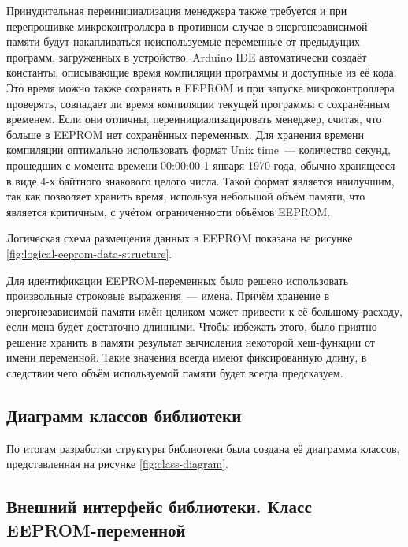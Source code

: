 Принудительная переинициализация менеджера также требуется и при перепрошивке микроконтроллера в противном случае в энергонезависимой памяти будут накапливаться неиспользуемые переменные от предыдущих программ, загруженных в устройство.
Arduino IDE автоматически создаёт константы, описывающие время компиляции программы и доступные из её кода.
Это время можно также сохранять в EEPROM и при запуске микроконтроллера проверять, совпадает ли время компиляции текущей программы с сохранённым временем.
Если они отличны, переинициализацировать менеджер, считая, что больше в EEPROM нет сохранённых переменных.
Для хранения времени компиляции оптимально использовать формат Unix time~--- количество секунд, прошедших с момента времени 00:00:00 1 января 1970 года, обычно хранящееся в виде 4-х байтного знакового целого числа.
Такой формат является наилучшим, так как позволяет хранить время, используя небольшой объём памяти, что является критичным, с учётом ограниченности объёмов EEPROM.

Логическая схема размещения данных в EEPROM показана на рисунке \ref{fig:logical-eeprom-data-structure}.

Для идентификации EEPROM-переменных было решено использовать произвольные строковые выражения~--- имена.
Причём хранение в энергонезависимой памяти имён целиком может привести к её большому расходу, если мена будет достаточно длинными.
Чтобы избежать этого, было приятно решение хранить в памяти результат вычисления некоторой хеш-функции от имени переменной.
Такие значения всегда имеют фиксированную длину, в следствии чего объём используемой памяти будет всегда предсказуем.



\subsection{Диаграмм классов библиотеки}

По итогам разработки структуры библиотеки была создана её диаграмма классов, представленная на рисунке \ref{fig:class-diagram}.


\subsection{Внешний интерфейс библиотеки. Класс EEPROM-переменной}

